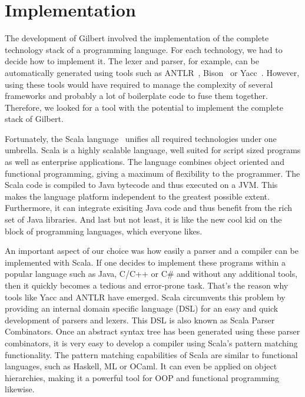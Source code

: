 \chapter{Implementation}
\label{cha:implementation}


The development of Gilbert involved the implementation of the complete technology stack of a programming language.
For each technology, we had to decide how to implement it.
The lexer and parser, for example, can be automatically generated using tools such as ANTLR~\cite{antlr}, Bison~\cite{bison} or Yacc~\cite{yacc}.
However, using these tools would have required to manage the complexity of several frameworks and probably a lot of boilerplate code to fuse them together.
Therefore, we looked for a tool with the potential to implement the complete stack of Gilbert.

Fortunately, the Scala language~\cite{scala,odersky:2010a} unifies all required technologies under one umbrella.
Scala is a highly scalable language, well suited for script sized programs as well as enterprise applications.
The language combines object oriented and functional programming, giving a maximum of flexibility to the programmer.
The Scala code is compiled to Java bytecode and thus executed on a JVM.
This makes the language platform independent to the greatest possible extent.
Furthermore, it can integrate exisiting Java code and thus benefit from the rich set of Java libraries.
And last but not least, it is like the new cool kid on the block of programming languages, which everyone likes.

An important aspect of our choice was how easily a parser and a compiler can be implemented with Scala.
If one decides to implement these programs within a popular language such as Java, C/C++ or C\# and without any additional tools, then it quickly becomes a tedious and error-prone task.
That's the reason why tools like Yacc and ANTLR have emerged.
Scala circumvents this problem by providing an internal domain specific language (DSL) for an easy and quick development of parsers and lexers.
This DSL is also known as Scala Parser Combinators.
Once an abstract syntax tree has been generated using these parser combinators, it is very easy to develop a compiler using Scala's pattern matching functionality.
The pattern matching capabilities of Scala are similar to functional languages, such as Haskell, ML or OCaml.
It can even be applied on object hierarchies, making it a powerful tool for OOP and functional programming likewise.

